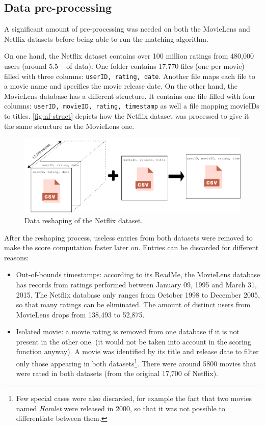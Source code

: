 \subsection{Data pre-processing}

A significant amount of pre-processing was needed on both the MovieLens and Netflix datasets before being able to run the matching algorithm. 

On one hand, the Netflix dataset contains over 100 million ratings from 480,000 users (around 5.5 \si{\giga\byte} of data). One folder contains 17,770 files (one per movie) filled with three columns: \texttt{userID, rating, date}. Another file maps each file to a movie name and specifies the movie release date. On the other hand, the MovieLens database has a different structure. It contains one file filled with four columns: \texttt{userID, movieID, rating, timestamp} as well a file mapping movieIDs to titles. \autoref{fig:nf-struct} depicts how the Netflix dataset was processed to give it the same structure as the MovieLens one.

\begin{figure}[h]
	\centering
	\includegraphics[width=\linewidth]{img/processing.pdf}
	\caption{Data reshaping of the Netflix dataset.}
	\label{fig:nf-struct}
\end{figure}

After the reshaping process, useless entries from both datasets were removed to make the score computation faster later on. Entries can be discarded for different reasons:

\begin{itemize}
	\item Out-of-bounds timestamps: according to its ReadMe, the MovieLens database has records from ratings performed between January 09, 1995 and March 31, 2015. The Netflix database only ranges from October 1998 to December 2005, so that many ratings can be eliminated. The amount of distinct users from MovieLens drops from 138,493 to 52,875.
	
	\item Isolated movie: a movie rating is removed from one database if it is not present in the other one. (it would not be taken into account in the scoring function anyway). A movie was identified by its title and release date to filter only those appearing in both datasets\footnote{Few special cases were also discarded, for example the fact that two movies named \textit{Hamlet} were released in 2000, so that it was not possible to differentiate between them.}. There were around 5800 movies that were rated in both datasets (from the original 17,700 of Netflix).
\end{itemize}

